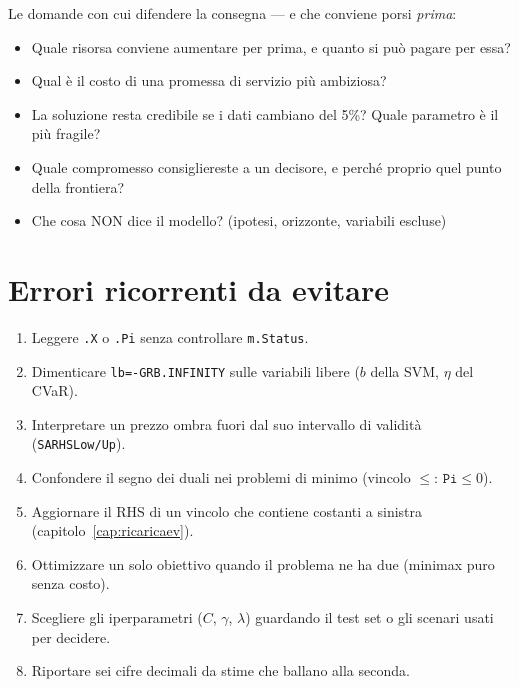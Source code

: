 Le domande con cui difendere la consegna --- e che conviene porsi \emph{prima}:

\begin{itemize}
  \item Quale risorsa conviene aumentare per prima, e quanto si può pagare per essa?
  \item Qual è il costo di una promessa di servizio più ambiziosa?
  \item La soluzione resta credibile se i dati cambiano del 5\%? Quale parametro è
        il più fragile?
  \item Quale compromesso consigliereste a un decisore, e perché proprio quel punto
        della frontiera?
  \item Che cosa NON dice il modello? (ipotesi, orizzonte, variabili escluse)
\end{itemize}

\section{Errori ricorrenti da evitare}

\begin{attenzione}
\begin{enumerate}
  \item Leggere \texttt{.X} o \texttt{.Pi} senza controllare \texttt{m.Status}.
  \item Dimenticare \texttt{lb=-GRB.INFINITY} sulle variabili libere
        ($b$ della SVM, $\eta$ del CVaR).
  \item Interpretare un prezzo ombra fuori dal suo intervallo di validità
        (\texttt{SARHSLow/Up}).
  \item Confondere il segno dei duali nei problemi di minimo (vincolo $\le$:
        $\texttt{Pi} \le 0$).
  \item Aggiornare il RHS di un vincolo che contiene costanti a sinistra
        (capitolo~\ref{cap:ricaricaev}).
  \item Ottimizzare un solo obiettivo quando il problema ne ha due (minimax puro
        senza costo).
  \item Scegliere gli iperparametri ($C$, $\gamma$, $\lambda$) guardando il test set
        o gli scenari usati per decidere.
  \item Riportare sei cifre decimali da stime che ballano alla seconda.
\end{enumerate}
\end{attenzione}

